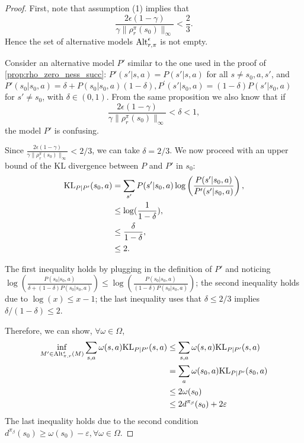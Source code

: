 \begin{proof}
First, note that  assumption (1) implies that
\[
\frac{2\epsilon (1-\gamma)} {\gamma \|\rho_r^{\pi}(s_0)\|_\infty} <  \frac{2}{3}. 
\]
Hence the set of alternative models ${\rm Alt}_{r,\pi}^\epsilon$ is not empty.

Consider an alternative model $P'$  similar to the one used in the proof of \cref{prop:rho_zero_ness_succ}:  $P'(s'|s,a) =P(s'|
s,a)$ for all $s\neq  s_0,a,s'$,  and $P'(s_0|s_0, a)=\delta + P(s_0|s_0,a)(1-\delta),  P^{'}(s'|s_0,a)=(1-\delta)P(s'|s_0,a)$ for $s'\neq s_0$, with $\delta\in (0,1)$.  From the same proposition we also know that if 
\[
\frac{2\epsilon(1-\gamma)}{\gamma \|\rho_r^{\pi}(s_0)\|_\infty} < \delta < 1,
\]
the model $P'$ is confusing. 


Since $\frac{2\epsilon(1-\gamma)}{\gamma \|\rho_r^{\pi}(s_0)\|_\infty}<2/3$, we can take $\delta =  2/3$.
We now proceed with an upper bound of the KL divergence between $P$ and $P'$ in $s_0$:
\begin{align*}
        {\rm KL}_{P|P'}(s_0,a)&=\sum_{s'}P(s'|s_0,a)\log\left(\frac{P(s'|s_0,a)}{P'(s'|s_0,a)}\right), \\
        &\leq\log(\frac{1}{1-\delta}), \\
        &\leq \frac{\delta}{1-\delta},\\
        &\le 2.
    \end{align*}
 
    The first inequality holds by plugging in the definition of $P'$ and noticing $\log(\frac{P(s_0|s_0,a)}{\delta+(1-\delta)P(s_0|s_0,a)})\le \log(\frac{P(s_0|s_0,a)}{(1-\delta)P(s_0|s_0,a)})$; the second inequality holds due to $\log(x)\le x-1$; the last inequality uses that $\delta \leq 2/3$ implies $\delta/(1-\delta)\leq 2$.

    Therefore, we can show, $\forall \omega\in\Omega$,
    \begin{align*}
        \inf_{ M'\in {\rm Alt}_{\pi,r}^\epsilon(M)}\sum_{s,a}\omega(s,a){\rm KL}_{P|P'}(s,a)&\le \sum_{s,a}\omega(s,a){\rm KL}_{P|P'}(s,a) \\
        &= \sum_a \omega(s_0,a){\rm KL}_{P|P'}(s_0,a)\\
        &\le 2\omega(s_0) \\
        &\le 2d^{\pi_\beta}(s_0) +2\varepsilon
    \end{align*}
    The last inequality holds due to the second condition $d^{\pi_\beta}(s_0)\ge \omega(s_0) - \varepsilon,\forall \omega\in\Omega$.


\end{proof}

